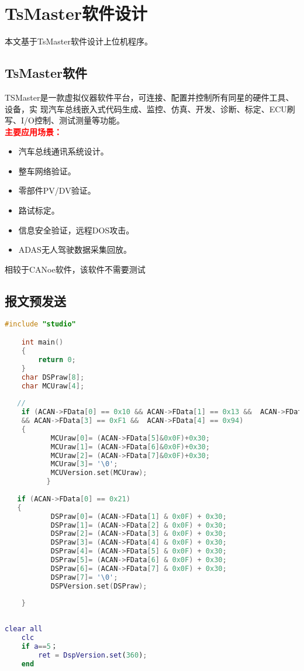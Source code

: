 \chapter{TsMaster软件设计}

本文基于TsMaster软件设计上位机程序。


\section{TsMaster软件}
TSMaster是一款虚拟仪器软件平台，可连接、配置并控制所有同星的硬件工具、设备，实
现汽车总线嵌入式代码生成、监控、仿真、开发、诊断、标定、ECU刷写、I/O控制、测试测量等功能。\\
\textbf{\textcolor{red}{主要应用场景：}}
\begin{itemize}
	\kaishu
	\item 汽车总线通讯系统设计。
	\item 整车网络验证。
	\item 零部件PV/DV验证。
	\item 路试标定。
	\item 信息安全验证，远程DOS攻击。
	\item ADAS无人驾驶数据采集回放。
\end{itemize}
相较于CANoe软件，该软件不需要测试


\section{报文预发送}
\begin{lstlisting}[language=c]
	#include "studio"

	int main()
	{
		return 0;
	}
	char DSPraw[8];
	char MCUraw[4];
	   
   // 
	if (ACAN->FData[0] == 0x10 && ACAN->FData[1] == 0x13 &&  ACAN->FData[2] == 0x62
	&& ACAN->FData[3] == 0xF1 &&  ACAN->FData[4] == 0x94)
	{
		   MCUraw[0]= (ACAN->FData[5]&0x0F)+0x30;
		   MCUraw[1]= (ACAN->FData[6]&0x0F)+0x30;
		   MCUraw[2]= (ACAN->FData[7]&0x0F)+0x30;
		   MCUraw[3]= '\0'; 
		   MCUVersion.set(MCUraw);
		  }
		  
   if (ACAN->FData[0] == 0x21)
   {
		   DSPraw[0]= (ACAN->FData[1] & 0x0F) + 0x30;
		   DSPraw[1]= (ACAN->FData[2] & 0x0F) + 0x30;
		   DSPraw[2]= (ACAN->FData[3] & 0x0F) + 0x30;
		   DSPraw[3]= (ACAN->FData[4] & 0x0F) + 0x30;
		   DSPraw[4]= (ACAN->FData[5] & 0x0F) + 0x30;
		   DSPraw[5]= (ACAN->FData[6] & 0x0F) + 0x30;
		   DSPraw[6]= (ACAN->FData[7] & 0x0F) + 0x30;
		   DSPraw[7]= '\0';
		   DSPVersion.set(DSPraw); 
   
	}
   
\end{lstlisting}

\begin{lstlisting}[language=matlab]
	clear all
	clc
	if a==5；
		ret = DspVersion.set(360);
	end
\end{lstlisting}










